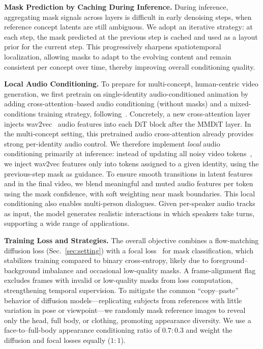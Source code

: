 \documentclass{article} %
\begin{document}
\noindent \textbf{Mask Prediction by Caching During Inference.} During inference, aggregating mask signals across layers is difficult in early denoising steps, when reference concept latents are still ambiguous. We adopt an iterative strategy: at each step, the mask predicted at the previous step is cached and used as a layout prior for the current step. This progressively sharpens spatiotemporal localization, allowing masks to adapt to the evolving content and remain consistent per concept over time, thereby improving overall conditioning quality.

\noindent \textbf{Local Audio Conditioning.} To prepare for multi-concept, human-centric video generation, we first pretrain on single-identity audio-conditioned animation by adding cross-attention–based audio conditioning (without masks) and a mixed-conditions training strategy, following~\citep{lin2025omnihuman}. Concretely, a new cross-attention layer injects wav2vec~\citep{baevski2020wav2vec2} audio features into each DiT block after the MMDiT layer. In the multi-concept setting, this pretrained audio cross-attention already provides strong per-identity audio control. We therefore implement \emph{local} audio conditioning primarily at inference: instead of updating all noisy video tokens~\citep{lin2025omnihuman,lin2024cyberhost}, we inject wav2vec features only into tokens assigned to a given identity, using the previous-step mask as guidance. To ensure smooth transitions in latent features and in the final video, we blend meaningful and muted audio features per token using the mask confidence, with soft weighting near mask boundaries. This local conditioning also enables multi-person dialogues. Given per-speaker audio tracks as input, the model generates realistic interactions in which speakers take turns, supporting a wide range of applications.

\noindent \textbf{Training Loss and Strategies.} The overall objective combines a flow-matching diffusion loss (Sec.~\ref{sec:setting}) with a focal loss~\citep{lin2017focal} for mask classification, which stabilizes training compared to binary cross-entropy, likely due to foreground–background imbalance and occasional low-quality masks. A frame-alignment flag excludes frames with invalid or low-quality masks from loss computation, strengthening temporal supervision. To mitigate the common “copy–paste” behavior of diffusion models—replicating subjects from references with little variation in pose or viewpoint—we randomly mask reference images to reveal only the head, full body, or clothing, promoting appearance diversity. We use a face-to–full-body appearance conditioning ratio of $0.7:0.3$ and weight the diffusion and focal losses equally ($1:1$).
\end{document}
